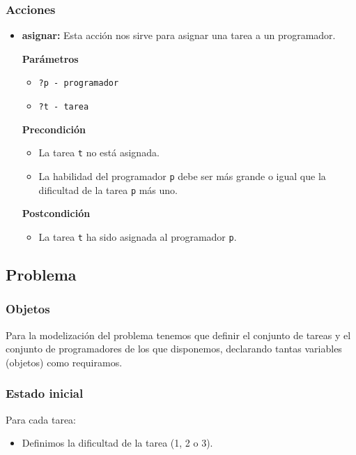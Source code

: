 \documentclass[11pt]{article}
\begin{document}
\subsubsection{Acciones} \label{basic_accion}
\begin{itemize}
  \item \textbf{asignar:} Esta acción nos sirve para asignar una tarea a un programador.
  
  \textbf{Parámetros}
  \begin{itemize}
  	\item \verb|?p - programador|
  	\item \verb|?t - tarea|
  \end{itemize}
  
  \textbf{Precondición}
  \begin{itemize}
  	\item La tarea \texttt{t} no está asignada.
  	\item La habilidad del programador \texttt{p} debe ser más grande o igual que la dificultad de la tarea \texttt{p} más uno.
  \end{itemize}
  
   \textbf{Postcondición}
   \begin{itemize}
  	\item La tarea \texttt{t} ha sido asignada al programador \texttt{p}.
  \end{itemize}
  
\end{itemize}

\subsection{Problema}
\subsubsection{Objetos}
Para la modelización del problema tenemos que definir el conjunto de tareas y el conjunto de programadores de los que disponemos, declarando tantas variables (objetos) como requiramos.

\subsubsection{Estado inicial} \label{basic_estadoinicial}
Para cada tarea:
\begin{itemize}
  	\item Definimos la dificultad de la tarea (1, 2 o 3).
\end{itemize}
\end{document}
